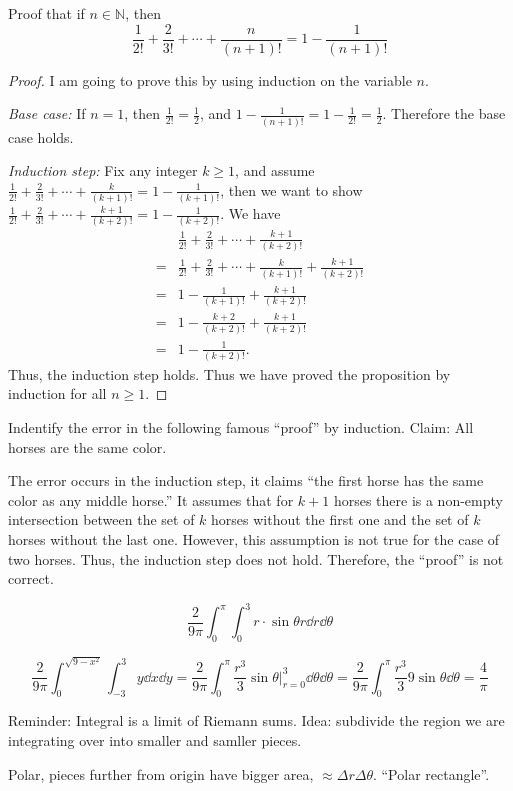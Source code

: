 \documentclass[10pt,twocolumn]{article}
\begin{document}
\begin{exercise}{8}
  Proof that if $n\in \mathbb{N}$, then
  \[
    \frac{1}{2!} + \frac{2}{3!} + \cdots + \frac{n}{(n+1)!} = 1 -
    \frac{1}{(n+1)!}
  \]
\end{exercise}

\begin{proof}
  I am going to prove this by using induction on the variable $n$.

  \emph{Base case:} If $n=1$, then $\frac{1}{2!} = \frac{1}{2}$, and
  $1-\frac{1}{(n+1)!}  = 1-\frac{1}{2!} = \frac{1}{2}$. Therefore the base case
  holds.

  \emph{Induction step:} Fix any integer $k\ge 1$, and assume $\frac{1}{2!} +
  \frac{2}{3!} + \cdots + \frac{k}{(k+1)!} = 1 - \frac{1}{(k+1)!}$, then we
  want to show $\frac{1}{2!} + \frac{2}{3!} + \cdots + \frac{k+1}{(k+2)!} = 1 -
  \frac{1}{(k+2)!}$. We have
  \begin{align*}
    &\frac{1}{2!} + \frac{2}{3!} + \cdots + \frac{k+1}{(k+2)!} \\
    =&\frac{1}{2!} + \frac{2}{3!} + \cdots + \frac{k}{(k+1)!} +
    \frac{k+1}{(k+2)!} \\
    =&1 - \frac{1}{(k+1)!} + \frac{k+1}{(k+2)!} \\
    =&1 - \frac{k+2}{(k+2)!} + \frac{k+1}{(k+2)!} \\
    =&1 - \frac{1}{(k+2)!}.
  \end{align*}
  Thus, the induction step holds. Thus we have proved the proposition by
  induction for all $n\ge 1$.
\end{proof}

\begin{exercise}{9}
  Indentify the error in the following famous ``proof'' by induction. Claim:
  All horses are the same color.
\end{exercise}

\begin{answer}{9}
  The error occurs in the induction step, it claims ``the first horse has the
  same color as any middle horse.'' It assumes that for $k+1$ horses there is a
  non-empty intersection between the set of $k$ horses without the first one
  and the set of $k$ horses without the last one. However, this assumption is
  not true for the case of two horses. Thus, the induction step does not hold.
  Therefore, the ``proof'' is not correct.
\end{answer}

\[
  \frac{2}{9\pi}\int_{0}^{\pi} \int_{0}^{3} r \cdot \sin \theta r \dd{r}\dd{\theta}
\]

\[
  \frac{2}{9\pi}\int_{0}^{\sqrt{9-x^2}} \int_{-3}^{3} y \dd{x}\dd{y} =
  \frac{2}{9\pi}\int_0^\pi \frac{r^3}{3}\sin\theta \Big\vert_{r=0}^3 \dd{\theta}
  \dd{\theta} =
  \frac{2}{9\pi}\int_0^\pi \frac{r^3}{3}9\sin\theta \dd{\theta} = \frac{4}{\pi}
\]

Reminder: Integral is a limit of Riemann sums.
Idea: subdivide the region we are integrating over into smaller and samller
pieces.

Polar, pieces further from origin have bigger area, $\approx \Delta r \Delta
\theta$. ``Polar rectangle''.
\end{document}
